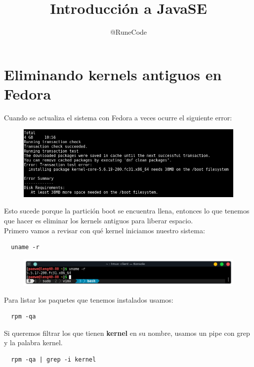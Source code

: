 \documentclass{article}
\title{Introducción a JavaSE}
\author{@RuneCode}
\begin{document}


\section{Eliminando kernels antiguos en Fedora}%
Cuando se actualiza el sistema con Fedora a veces ocurre el siguiente error:

\begin{figure}[h!]
  \centering
  \includegraphics[scale=0.75]{./Pictures/001_error.png}
\end{figure}

Esto sucede porque la partición boot se encuentra llena, entonces lo que
tenemos que hacer es eliminar los kernels antiguos para liberar espacio.\\

Primero vamos a revisar con qué kernel iniciamos nuestro sistema:

\begin{verbatim}
  uname -r
\end{verbatim}

\begin{figure}[h!]
  \centering
  \includegraphics[scale=0.75]{./Pictures/002_uname.png}
\end{figure}

Para listar los paquetes que tenemos instalados usamos:

\begin{verbatim}
  rpm -qa
\end{verbatim}

Si queremos filtrar los que tienen \textbf{kernel} en su nombre, usamos un pipe
con grep y la palabra kernel.

\begin{verbatim}
  rpm -qa | grep -i kernel
\end{verbatim}
\end{document}

